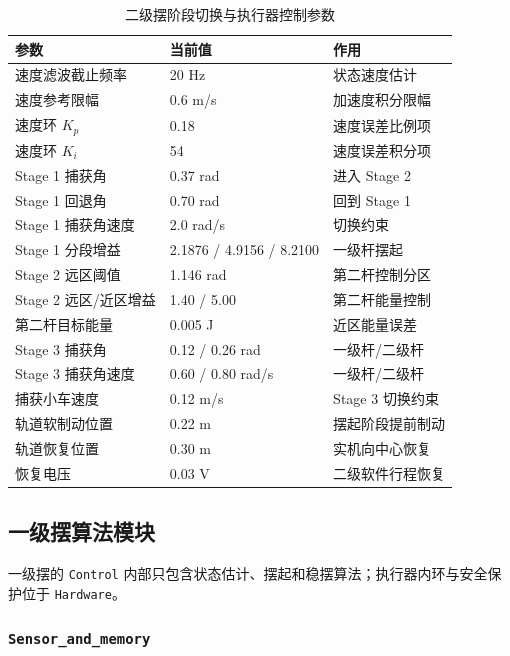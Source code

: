 \documentclass[12pt,a4paper]{article}
\begin{document}
\begin{table}[htbp]
    \centering
    \caption{二级摆阶段切换与执行器控制参数}
    \label{tab:doublecontrolparams}
    \renewcommand{\arraystretch}{1.3}
    \begin{tabular}{@{}p{7.0cm}p{3.3cm}p{3.5cm}@{}}
        \toprule
        \textbf{参数} & \textbf{当前值} & \textbf{作用} \\
        \midrule
        速度滤波截止频率 & 20 Hz & 状态速度估计 \\
        速度参考限幅 & 0.6 m/s & 加速度积分限幅 \\
        速度环 $K_p$ & 0.18 & 速度误差比例项 \\
        速度环 $K_i$ & 54 & 速度误差积分项 \\
        Stage 1 捕获角 & 0.37 rad & 进入 Stage 2 \\
        Stage 1 回退角 & 0.70 rad & 回到 Stage 1 \\
        Stage 1 捕获角速度 & 2.0 rad/s & 切换约束 \\
        Stage 1 分段增益 & 2.1876 / 4.9156 / 8.2100 & 一级杆摆起 \\
        Stage 2 远区阈值 & 1.146 rad & 第二杆控制分区 \\
        Stage 2 远区/近区增益 & 1.40 / 5.00 & 第二杆能量控制 \\
        第二杆目标能量 & 0.005 J & 近区能量误差 \\
        Stage 3 捕获角 & 0.12 / 0.26 rad & 一级杆/二级杆 \\
        Stage 3 捕获角速度 & 0.60 / 0.80 rad/s & 一级杆/二级杆 \\
        捕获小车速度 & 0.12 m/s & Stage 3 切换约束 \\
        轨道软制动位置 & 0.22 m & 摆起阶段提前制动 \\
        轨道恢复位置 & 0.30 m & 实机向中心恢复 \\
        恢复电压 & 0.03 V & 二级软件行程恢复 \\
        \bottomrule
    \end{tabular}
\end{table}

\subsection{一级摆算法模块}

一级摆的 \texttt{Control} 内部只包含状态估计、摆起和稳摆算法；执行器内环与安全保护位于 \texttt{Hardware}。

\subsubsection{\texorpdfstring{\texttt{Sensor\_and\_memory}}{Sensor and memory}}
\end{document}
